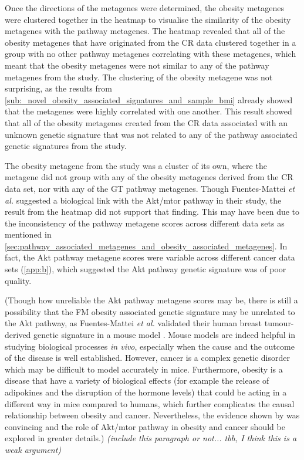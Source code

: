 Once the directions of the metagenes were determined, the obesity metagenes were clustered together in the heatmap to visualise the similarity of the obesity metagenes with the pathway metagenes.
The heatmap revealed that all of the obesity metagenes that have originated from the CR data clustered together in a group with no other pathway metagenes correlating with these metagenes, which meant that the obesity metagenes were not similar to any of the pathway metagenes from the \citet{Gatza2010a} study.
The clustering of the obesity metagene was not surprising, as the results from \cref{sub:_novel_obesity_associated_signatures_and_sample_bmi} already showed that the metagenes were highly correlated with one another.
This result showed that all of the obesity metagenes created from the CR data associated with an unknown genetic signature that was not related to any of the pathway associated genetic signatures from the \citet{Gatza2010a} study.

The obesity metagene from the \citet{Fuentes-Mattei2014} study was a cluster of its own, where the metagene did not group with any of the obesity metagenes derived from the CR data set, nor with any of the GT pathway metagenes.
Though Fuentes-Mattei \textit{et al.} suggested a biological link with the Akt/\gls{mtor} pathway in their study, the result from the heatmap did not support that finding.
This may have been due to the inconsistency of the pathway metagene scores across different data sets as mentioned in \cref{sec:pathway_associated_metagenes_and_obesity_associated_metagenes}.
In fact, the Akt pathway metagene scores were variable across different cancer data sets (\cref{app:b}), which suggested the Akt pathway genetic signature was of poor quality.

(Though how unreliable the Akt pathway metagene scores may be, there is still a possibility that the FM obesity associated genetic signature may be unrelated to the Akt pathway, as Fuentes-Mattei \textit{et al.} validated their human breast tumour-derived genetic signature in a mouse model \citep{Fuentes-Mattei2014}.
	Mouse models are indeed helpful in studying biological processes \textit{in vivo}, especially when the cause and the outcome of the disease is well established.
	However, cancer is a complex genetic disorder which may be difficult to model accurately in mice.
	Furthermore, obesity is a disease that have a variety of biological effects (for example the release of adipokines and the disruption of the hormone levels) that could be acting in a different way in mice compared to humans, which further complicates the causal relationship between obesity and cancer.
	Nevertheless, the evidence shown by \citet{Fuentes-Mattei2014} was convincing and the role of Akt/\gls{mtor} pathway in obesity and cancer should be explored in greater details.)
\textit{(include this paragraph or not... tbh, I think this is a weak argument)}

